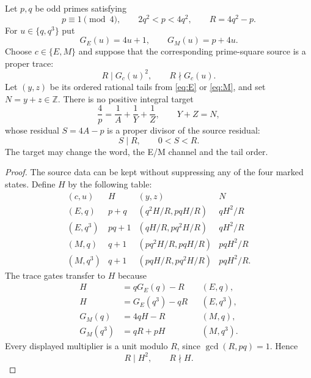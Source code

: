 \begin{theorem}
\label{thm:prime-square-fixed-sum}
Let $p,q$ be odd primes satisfying
\[
 p\equiv1\pmod4,\qquad 2q^2<p<4q^2,
 \qquad R=4q^2-p.
\]
For $u\in\{q,q^3\}$ put
\[
 G_E(u)=4u+1,\qquad G_M(u)=p+4u.
\]
Choose $c\in\{E,M\}$ and suppose that the corresponding prime-square source
is a proper trace:
\[
 R\mid G_c(u)^2,\qquad R\nmid G_c(u).
\]
Let $(y,z)$ be its ordered rational tails from
\eqref{eq:E} or \eqref{eq:M}, and set $N=y+z\in\mathbb Z$.
There is no positive integral target
\[
 \frac4p=\frac1A+\frac1Y+\frac1Z,\qquad Y+Z=N,
\]
whose residual $S=4A-p$ is a proper divisor of the source residual:
\[
 S\mid R,\qquad 0<S<R.
\]
The target may change the word, the E/M channel and the tail order.
\end{theorem}
\begin{proof}
The source data can be kept without suppressing any of the four marked
states.  Define $H$ by the following table:
\begin{equation}\label{eq:prime-square-source-table}
\begin{array}{c|c|c|c}
(c,u)&H&(y,z)&N\\ \hline
(E,q)&p+q&
\left(q^2H/R,pqH/R\right)&qH^2/R\\[1mm]
(E,q^3)&pq+1&
\left(qH/R,pq^2H/R\right)&qH^2/R\\[1mm]
(M,q)&q+1&
\left(pq^2H/R,pqH/R\right)&pqH^2/R\\[1mm]
(M,q^3)&q+1&
\left(pqH/R,pq^2H/R\right)&pqH^2/R .
\end{array}
\end{equation}
The trace gates transfer to $H$ because
\[
\begin{aligned}
 H&=qG_E(q)-R &&(E,q),\\
 H&=G_E(q^3)-qR &&(E,q^3),\\
 G_M(q)&=4qH-R &&(M,q),\\
 G_M(q^3)&=qR+pH &&(M,q^3).
\end{aligned}
\]
Every displayed multiplier is a unit modulo $R$, since
$\gcd(R,pq)=1$.  Hence
\[
 R\mid H^2,\qquad R\nmid H.
\]


\end{proof}
